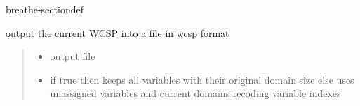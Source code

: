 \documentclass[letterpaper,10pt,openany,oneside,english]{sphinxmanual}
\begin{document}
\begin{fulllineitems}
\begin{sphinxuseclass}{breathe-sectiondef}
\begin{fulllineitems}
\label{\detokenize{ref/ref_cpp:_CPPv4N11WeightedCSP4dumpER7ostreamb}}\label{\detokenize{ref/ref_cpp:_CPPv3N11WeightedCSP4dumpER7ostreamb}}\label{\detokenize{ref/ref_cpp:_CPPv2N11WeightedCSP4dumpER7ostreamb}}\label{\detokenize{ref/ref_cpp:WeightedCSP::dump__ostreamR.b}}
\pysigstartsignatures
\pysigstartmultiline
{}
\pysigstopmultiline
\pysigstopsignatures
\sphinxAtStartPar
output the current WCSP into a file in wcsp format 
\begin{quote}\begin{description}
\begin{itemize}
\item {} 
\sphinxAtStartPar
{} \textendash{} output file

\item {} 
\sphinxAtStartPar
{} \textendash{} if true then keeps all variables with their original domain size else uses unassigned variables and current domains recoding variable indexes 

\end{itemize}

\end{description}\end{quote}

\end{fulllineitems}



\end{sphinxuseclass}
\end{fulllineitems}
\end{document}
